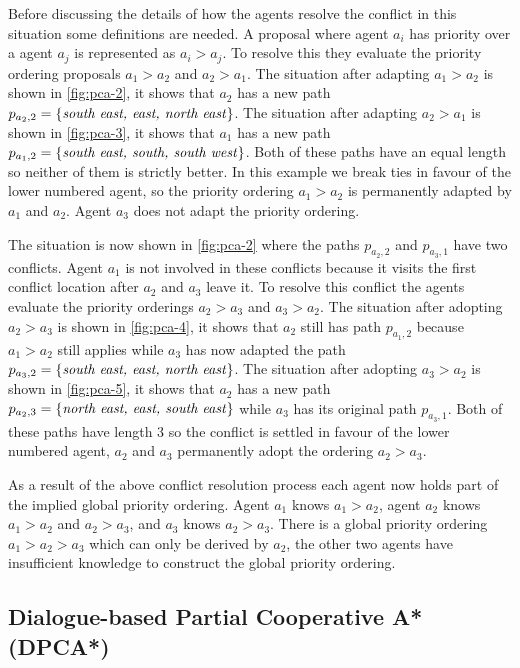 Before discussing the details of how the agents resolve the conflict in this
situation some definitions are needed. A proposal where agent $a_i$ has
priority over a agent $a_j$ is represented as $a_i > a_j$. To resolve this they 
evaluate the priority ordering proposals 
$a_1 > a_2$ and $a_2 > a_1$. The situation after adapting $a_1 > a_2$ is shown 
in \autoref{fig:pca-2}, it shows that $a_2$ has a new path $p_{a_2,2} = 
\{\text{\emph{south east, east, north east}}\}$. The situation after adapting 
$a_2 > a_1$ is shown in \autoref{fig:pca-3}, it shows that $a_1$ has a new path 
$p_{a_1,2} = \{\text{\emph{south east, south, south west}}\}$. Both of these 
paths have an equal length so neither of them is strictly better. In this 
example we break ties in favour of the lower numbered agent, so the priority 
ordering $a_1 > a_2$ is permanently adapted by $a_1$ and $a_2$. Agent $a_3$ 
does not adapt the priority ordering.

The situation is now shown in \autoref{fig:pca-2} where the paths $p_{a_2,2}$ 
and $p_{a_3,1}$ have two conflicts. Agent $a_1$ is not involved in these 
conflicts because it visits the first conflict location after $a_2$ and $a_3$ 
leave it. To resolve this conflict the agents evaluate the priority orderings 
$a_2 > a_3$ and $a_3 > a_2$. The situation after adopting $a_2 > a_3$ is shown 
in \autoref{fig:pca-4}, it shows that $a_2$ still has path $p_{a_1,2}$ because 
$a_1 > a_2$ still applies while $a_3$ has now adapted the path 
$p_{a_3,2} = \{\text{\emph{south east, east, north east}}\}$. The situation 
after adopting $a_3 > a_2$ is shown in \autoref{fig:pca-5}, it shows that $a_2$ 
has a new path $p_{a_2,3} = \{\text{\emph{north east, east, south east}}\}$ 
while $a_3$ has its original path $p_{a_3,1}$. Both of these paths have length 
3 so the conflict is settled in favour of the lower numbered agent, $a_2$ and 
$a_3$ permanently adopt the ordering $a_2 > a_3$.

As a result of the above conflict resolution process each agent now holds part 
of the implied global priority ordering. Agent $a_1$ knows $a_1 > a_2$, agent 
$a_2$ knows $a_1 > a_2$ and $a_2 > a_3$, and $a_3$ knows $a_2 > a_3$. There is 
a global priority ordering $a_1 > a_2 > a_3$ which can only be derived by 
$a_2$, the other two agents have insufficient knowledge to construct the global 
priority ordering.

\subsection{Dialogue-based Partial Cooperative A* (DPCA*)}

